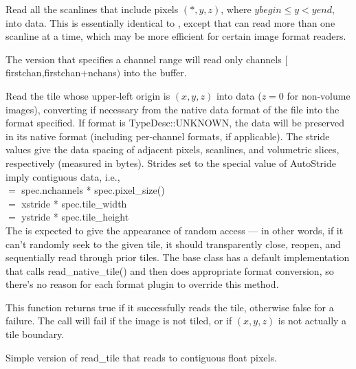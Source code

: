 Read all the scanlines that include pixels $(*,y,z)$, where
$\mathit{ybegin} \le y < \mathit{yend}$, into {\kw data}.  This is 
essentially identical to \readscanline, except that can read more than
one scanline at a time, which may be more efficient for certain image
format readers.

The version that specifies a channel range will read only
channels $[${\cf firstchan},{\cf firstchan+nchans}$)$ into the buffer.
\apiend


Read the tile whose upper-left origin is $(x,y,z)$ into {\kw data}
($z=0$ for non-volume images),
converting if necessary from the native data format of the file into the 
{\kw format} specified.
If {\cf format} is {\cf TypeDesc::UNKNOWN}, the data will be preserved 
in its native format (including per-channel formats, if applicable).
The stride values
give the data spacing of adjacent pixels, scanlines, and volumetric
slices, respectively (measured in bytes).  Strides set to the special
value of {\kw AutoStride} imply contiguous data, i.e., \\
 $=$ {\kw spec.nchannels * spec.pixel_size()} \\
 $=$ {\kw xstride * spec.tile_width} \\
 $=$ {\kw ystride * spec.tile_height} \\
The \ImageInput is expected to give the appearance of random access
--- in other words, if it can't randomly seek to the given tile, it
should transparently close, reopen, and sequentially read through prior
tiles.  The base \ImageInput class has a default implementation
that calls {\cf read_native_tile()} and then does appropriate format conversion,
so there's no reason for each format plugin to override this method.

This function returns {\cf true} if it successfully reads the tile,
otherwise {\cf false} for a failure.
The call will fail if the image is not tiled, or if $(x,y,z)$ is not
actually a tile boundary.
\apiend


Simple version of {\kw read_tile} that reads to contiguous float pixels.
\apiend


